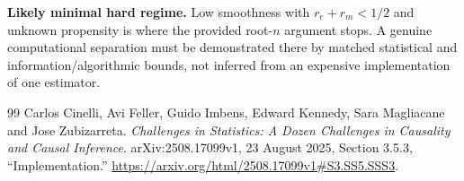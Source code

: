 \documentclass[11pt,a4paper]{article}
\theoremstyle{definition}
\begin{document}
\textbf{Likely minimal hard regime.} Low smoothness with $r_e+r_m<1/2$ and unknown propensity is where the provided root-$n$ argument stops. A genuine computational separation must be demonstrated there by matched statistical and information/algorithmic bounds, not inferred from an expensive implementation of one estimator.

\clearpage
\begin{thebibliography}{99}
Carlos Cinelli, Avi Feller, Guido Imbens, Edward Kennedy, Sara Magliacane and Jose Zubizarreta. \emph{Challenges in Statistics: A Dozen Challenges in Causality and Causal Inference}. arXiv:2508.17099v1, 23 August 2025, Section 3.5.3, ``Implementation.'' \url{https://arxiv.org/html/2508.17099v1#S3.SS5.SSS3}.

\end{thebibliography}
\end{document}
